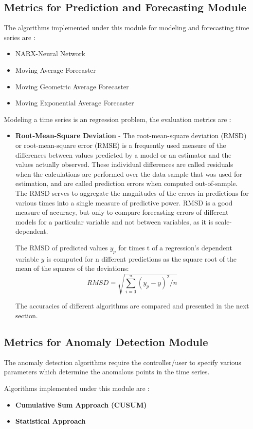 \documentclass[12pt,a4paper]{report}
\begin{document}
\subsection{Metrics for Prediction and Forecasting Module}
The algorithms implemented under this module for modeling and forecasting time series are :
\begin{itemize}
\item NARX-Neural Network
\item Moving Average Forecaster
\item Moving Geometric Average Forecaster
\item Moving Exponential Average Forecaster
\end{itemize}
Modeling a time series is an regression problem, the evaluation metrics are :
\begin{itemize}
\item \textbf{Root-Mean-Square Deviation} - The root-mean-square deviation (RMSD) or root-mean-square error (RMSE) is a frequently used measure of the differences between values predicted by a model or an estimator and the values actually observed. These individual differences are called residuals when the calculations are performed over the data sample that was used for estimation, and are called prediction errors when computed out-of-sample. The RMSD serves to aggregate the magnitudes of the errors in predictions for various times into a single measure of predictive power. RMSD is a good measure of accuracy, but only to compare forecasting errors of different models for a particular variable and not between variables, as it is scale-dependent.




The RMSD of predicted values $y_p$ for times t of a regression's dependent variable $y$ is computed for n different predictions as the square root of the mean of the squares of the deviations:
$$RMSD=\sqrt{\sum_{i=0}^{n}{(y_p-y)^2/n}}$$

The accuracies  of different algorithms are compared and presented in the next section.
\end{itemize}
\subsection{Metrics for Anomaly Detection  Module}
The anomaly detection algorithms require the controller/user to specify various parameters which determine the anomalous points in the time series.


Algorithms implemented under this module are :
\begin{itemize}
\item \textbf{Cumulative Sum Approach (CUSUM)}
\item \textbf{Statistical Approach}
\end{itemize}
\end{document}
